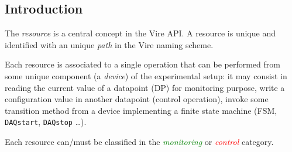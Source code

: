
\subsection{Introduction}

The \emph{resource} is a central concept  in the Vire API.  A resource
is unique and identified with an unique \emph{path} in the Vire naming
scheme.

Each resource is associated to a  single operation that can be performed
from  some  unique component  (a  \emph{device})  of the  experimental
setup: it may consist in reading the current value of a datapoint (DP)
for  monitoring  purpose,  write  a  configuration  value  in  another
datapoint (control  operation), invoke  some transition method  from a
device implementing a finite state machine (FSM, \texttt{DAQstart}, \texttt{DAQstop} \dots).

Each      resource     can/must      be     classified      in     the
\textcolor{green}{\emph{monitoring}}                                or
\textcolor{red}{\emph{control}} category.

